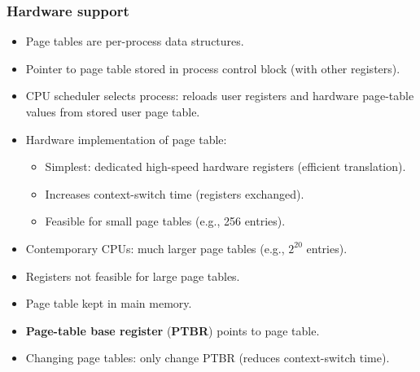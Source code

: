 \subsubsection*{Hardware support}
\begin{itemize}
    \item Page tables are per-process data structures.
    \item Pointer to page table stored in process control block (with other registers).
    \item CPU scheduler selects process: reloads user registers and hardware page-table values from stored user page table.
    \item Hardware implementation of page table:
    \begin{itemize}
        \item Simplest: dedicated high-speed hardware registers (efficient translation).
        \item Increases context-switch time (registers exchanged).
        \item Feasible for small page tables (e.g., 256 entries).
    \end{itemize}
    \item Contemporary CPUs: much larger page tables (e.g., $2^{20}$ entries).
    \item Registers not feasible for large page tables.
    \item Page table kept in main memory.
    \item \textbf{Page-table base register} (\textbf{PTBR}) points to page table.
    \item Changing page tables: only change PTBR (reduces context-switch time).
\end{itemize}

